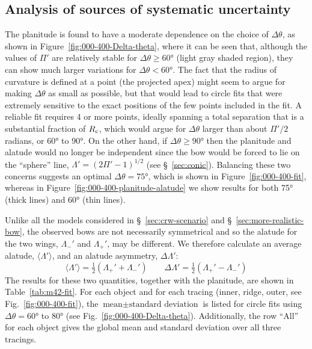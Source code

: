 \subsection{Analysis of sources of systematic uncertainty}
\label{sec:analys-sourc-syst}

The planitude is found to have a moderate dependence on the choice of
\(\Delta\theta\), as shown in Figure~\ref{fig:000-400-Delta-theta}, where it can
be seen that, although the values of \(\Pi'\) are relatively stable for
\(\Delta\theta \ge \ang{60}\) (light gray shaded region), they can show much
larger variations for \(\Delta\theta < \ang{60}\).  The fact that the radius of
curvature is defined at a point (the projected apex) might seem to
argue for making \(\Delta\theta\) as small as possible, but that would lead to
circle fits that were extremely sensitive to the exact positions of
the few points included in the fit.  A reliable fit requires 4 or more
points, ideally spanning a total separation that is a substantial
fraction of \(R_{\mathrm{c}}\), which would argue for \(\Delta\theta\) larger than about
\(\Pi'/2\) radians, or \ang{60} to \ang{90}.  On the other hand, if
\(\Delta\theta \ge \ang{90}\) then the planitude and alatude would no longer be
independent since the bow would be forced to lie on the ``sphere''
line, \(\Lambda' = (2 \Pi' - 1)^{1/2}\) (see \S~\ref{sec:conic}).  Balancing
these two concerns suggests an optimal \(\Delta\theta = \ang{75}\), which is
shown in Figure~\ref{fig:000-400-fit}, whereas in
Figure~\ref{fig:000-400-planitude-alatude} we show results for both
\ang{75} (thick lines) and \ang{60} (thin lines).

Unlike all the models considered in \S~\ref{sec:crw-scenario} and
\S~\ref{sec:more-realistic-bow}, the observed bows are not necessarily
symmetrical and so the alatude for the two wings, \(\Lambda_-'\) and
\(\Lambda_+'\), may be different.  We therefore calculate an average
alatude, \(\langle\Lambda'\rangle\), and an alatude asymmetry, \(\Delta\Lambda'\):
\begin{equation}
  \label{eq:alatude-average-and-asym}
  \langle\Lambda'\rangle = \tfrac12 \left( \Lambda_+' + \Lambda_-' \right)
  \quad\quad \Delta\Lambda' = \tfrac12 \left( \Lambda_+' - \Lambda_-' \right)
\end{equation}
The results for these two quantities, together with the planitude, are
shown in Table~\ref{tab:m42-fit}.  For each object and for each tracing
(inner, ridge, outer, see Fig.~\ref{fig:000-400-fit}), the
\(\text{mean} \pm \text{standard\ deviation}\) is listed for circle
fits using \(\Delta\theta = \ang{60}\) to \ang{80} (see
Fig.~\ref{fig:000-400-Delta-theta}).  Additionally, the row ``All''
for each object gives the global mean and standard deviation over all
three tracings.

